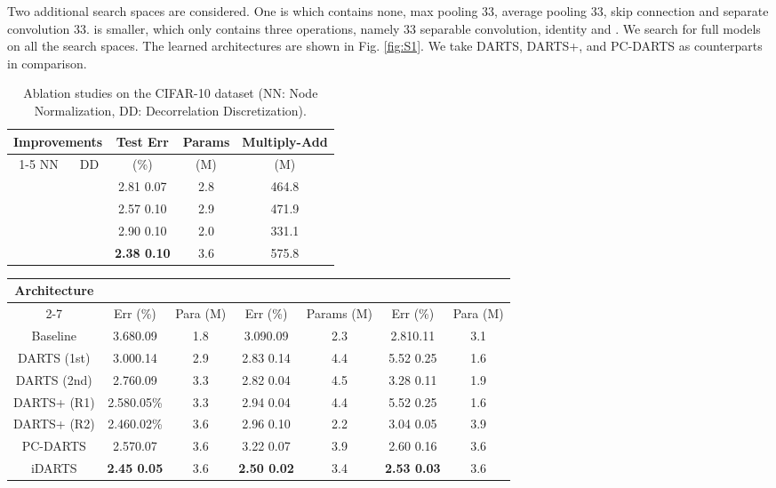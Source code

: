 \documentclass[journal]{IEEEtran}
\begin{document}
Two additional search spaces are considered. One is  which contains none, max pooling 33, average pooling 33, skip connection and separate convolution 33.  is smaller, which only contains three operations, namely 33 separable convolution, identity and . We search for full models on all the search spaces. The learned architectures are shown in Fig. \ref{fig:S1}. We take DARTS, DARTS+, and PC-DARTS as counterparts in comparison.





\begin{table}[!htpb]
\begin{center}
\caption{Ablation studies on the CIFAR-10 dataset (NN: Node Normalization, DD: Decorrelation Discretization).} 
\begin{tabular}{c|c|c|c|c}
\hline
\hline
\multicolumn{2}{c|}{Improvements} & Test Err & Params & Multiply-Add \\
\cline{1-5}
 NN & DD & (\%) & (M) & (M)\\
\hline

 &  & 2.81  0.07 &  2.8 & 464.8\\
 &  & 2.57  0.10 & 2.9 & 471.9\\
 &  & 2.90  0.10 & 2.0 & 331.1\\
 &  & \textbf{2.38  0.10} & 3.6 & 575.8\\
\hline
\hline
\end{tabular}
\label{T.Ablation}
\end{center}
\end{table}




\begin{table*}[!htpb]
\begin{center}
\caption{Comparison of DARTS-based methods in different settings on the CIFAR-10 dataset. R1 and R2 denote Criterion 1 and Criterion 1* in DARTS+ respectively.} 
{
\begin{tabular}{c|c|c|c|c|c|c}
\hline
\hline
\multirow{2}{*}{Architecture} & \multicolumn{2}{c|}{} & \multicolumn{2}{c}{} & \multicolumn{2}{c}{}\\
\cline{2-7}
& Err (\%) & Para (M) &  Err (\%) & Params (M) &  Err (\%) & Para (M)\\
\hline
Baseline & 3.680.09 & 1.8 & 3.090.09 &2.3&  2.810.11 & 3.1 \\
\hline
DARTS (1st) & 3.000.14 & 2.9 & 2.83  0.14 & 4.4 & 5.52  0.25 & 1.6\\
DARTS (2nd)& 2.760.09 & 3.3 & 2.82  0.04 & 4.5 & 3.28  0.11 & 1.9\\
DARTS+ (R1)& 2.580.05\% & 3.3 & 2.94  0.04& 4.4 & 5.52  0.25 & 1.6\\
DARTS+ (R2)& 2.460.02\% & 3.6 & 2.96  0.10 & 2.2 & 3.04  0.05 & 3.9\\
PC-DARTS & 2.570.07 & 3.6 & 3.22  0.07 & 3.9 & 2.60  0.16 & 3.6\\
\hline
iDARTS & \textbf{2.45 0.05} & 3.6 & \textbf{2.50  0.02} & 3.4 & \textbf{2.53  0.03} & 3.6\\
\hline
\hline
\end{tabular}}
\label{T.Search}
\end{center}
\end{table*}
\end{document}
